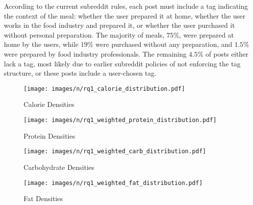 According to the current subreddit rules, each post must include a tag indicating the context of the meal: whether the user prepared it at home, whether the user works in the food industry and prepared it, or whether the user purchased it without personal preparation. The majority of meals, $75$\%, were prepared at home by the users, while $19$\% were purchased without any preparation, and $1.5$\% were prepared by food industry professionals. 
The remaining $4.5$\% of posts either lack a tag, most likely due to earlier subreddit policies of not enforcing the tag structure, or these posts include a user-chosen tag.

\begin{figure*}[t]
    \centering
    \begin{subfigure}{0.25\textwidth}
        \centering
        \texttt{[image: images/n/rq1\_calorie\_distribution.pdf]}
        \caption{Calorie Densities}
        \label{fig:rq1_calorie}
    \end{subfigure}
    \hfill
    \begin{subfigure}{0.24\textwidth}
        \centering
        \texttt{[image: images/n/rq1\_weighted\_protein\_distribution.pdf]}
        \caption{Protein Densities}
        \label{fig:rq1_protein}
        \end{subfigure}
    \hfill
    \begin{subfigure}{0.24\textwidth}
        \centering
        \texttt{[image: images/n/rq1\_weighted\_carb\_distribution.pdf]}
        \caption{Carbohydrate Densities}
        \label{fig:rq1_carb}
        \end{subfigure}
    \hfill
    \begin{subfigure}{0.24\textwidth}
        \centering
        \texttt{[image: images/n/rq1\_weighted\_fat\_distribution.pdf]}
        \caption{Fat Densities}
        \label{fig:rq1_fat}
        \end{subfigure}


    \medskip



\end{figure*}
